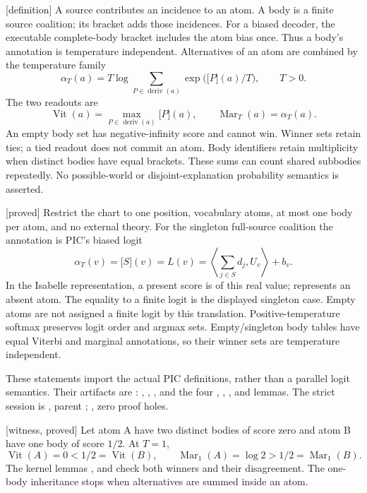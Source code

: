 \documentclass[11pt]{article}
\newcommand{\status}[1]{\textsf{[#1]}}
\newcommand{\Vit}{\operatorname{Vit}}
\newcommand{\Mar}{\operatorname{Mar}}
\newcommand{\deriv}{\operatorname{deriv}}
\newcommand{\bracket}[2]{\lbrack #1\rbrack(#2)}
\begin{document}
\status{definition} A source contributes an incidence to an atom. A body is
a finite source coalition; its bracket adds those incidences. For a biased
decoder, the executable complete-body bracket includes the atom bias once.
Thus a body's annotation is temperature independent. Alternatives of an
atom are combined by the temperature family
\[
 \alpha_T(a)=T\log\sum_{P\in\deriv(a)}
      \exp\bigl(\bracket{P}{a}/T\bigr),\qquad T>0.
\]
The two readouts are
\[
 \Vit(a)=\max_{P\in\deriv(a)}\bracket{P}{a},\qquad
 \Mar_T(a)=\alpha_T(a).
\]
An empty body set has negative-infinity score and cannot win. Winner sets
retain ties; a tied readout does not commit an atom. Body identifiers retain
multiplicity when distinct bodies have equal brackets. These sums can count
shared subbodies repeatedly. No possible-world or disjoint-explanation
probability semantics is asserted.

\status{proved} Restrict the chart to one position, vocabulary atoms, at most
one body per atom, and no external theory. For the singleton full-source
coalition the annotation is PIC's biased logit
\[
 \alpha_T(v)=\bracket{S}{v}=L(v)
       =\left\langle\sum_{j\in S}d_j,U_v\right\rangle+b_v.
\]
In the Isabelle representation, a present score is  of this
real value;  represents an absent atom. The equality to a finite
logit is the displayed singleton case. Empty atoms are not assigned a
finite logit by this translation. Positive-temperature softmax preserves
logit order and argmax sets. Empty/singleton body tables have equal Viterbi
and marginal annotations, so their winner sets are temperature independent.

These statements import the actual PIC definitions, rather than a parallel
logit semantics. Their artifacts are :
, ,
, and the four
,
,
, and
 lemmas. The strict session is ,
parent ; , zero proof holes.

\status{witness, proved} Let atom A have two distinct bodies of score zero
and atom B have one body of score $1/2$. At $T=1$,
\[
 \Vit(A)=0<1/2=\Vit(B),\qquad
 \Mar_1(A)=\log 2>1/2=\Mar_1(B).
\]
The kernel lemmas ,  and
 check both winners and their disagreement.
The one-body inheritance stops when alternatives are summed inside an atom.
\end{document}
